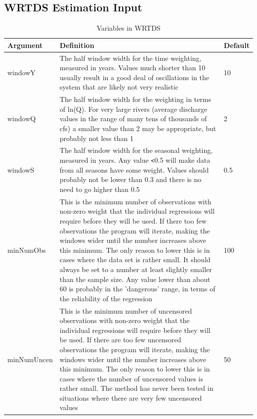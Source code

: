 \documentclass[a4paper,11pt]{article}\usepackage{graphicx, color}
\begin{document}
\subsection{WRTDS Estimation Input}
\label{sec:wrtdsInputVariables}
\begin{table}[ht]
\caption{Variables in WRTDS  \label{tab:WRTDS}}
\begin{tabularx}{\textwidth}{lXl}
\hline
  \textbf{Argument} & \textbf{Definition} & \textbf{Default} \\
\hline
windowY & The half window width for the time weighting, measured in years.  Values much shorter than 10 usually result in a good deal of oscillations in the system that are likely not very realistic & 10\\
windowQ & The half window width for the weighting in terms of ln(Q).  For very large rivers (average discharge values in the range of many tens of thousands of cfs) a smaller value than 2 may be appropriate, but probably not less than 1 & 2 \\
windowS & The half window width for the seasonal weighting, measured in years.  Any value \texttt{<}0.5 will make data from all seasons have some weight.  Values should probably not be lower than 0.3 and there is no need to go higher than 0.5 & 0.5 \\
minNumObs & This is the minimum number of observations with non-zero weight that the individual regressions will require before they will be used.  If there too few observations the program will iterate, making the windows wider until the number increases above this minimum.  The only reason to lower this is in cases where the data set is rather small.  It should always be set to a number at least slightly smaller than the sample size.  Any value lower than about 60 is probably in the 'dangerous' range, in terms of the reliability of the regression & 100 \\ 
minNumUncen & This is the minimum number of uncensored observations with non-zero weight that the individual regressions will require before they will be used.  If there are too few uncensored observations the program will iterate, making the windows wider until the number increases above this minimum.  The only reason to lower this is in cases where the number of uncensored values is rather small.  The method has never been tested in situations where there are very few uncensored values & 50 \\
\hline
\end{tabularx}

\end{table}
\end{document}
